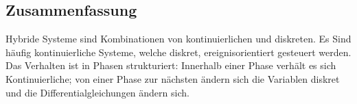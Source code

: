 \documentclass[11pt, fleqn, a4paper, leqno]{scrartcl} %
\begin{document}
			\subsection{Zusammenfassung}
				Hybride Systeme sind Kombinationen von kontinuierlichen und diskreten. Es Sind häufig kontinuierliche Systeme, welche diskret, ereignisorientiert gesteuert werden.\\
				Das Verhalten ist in Phasen strukturiert: Innerhalb einer Phase verhält  es sich Kontinuierliche; von einer Phase zur nächsten ändern sich die Variablen diskret und die Differentialgleichungen ändern sich.
\end{document}
